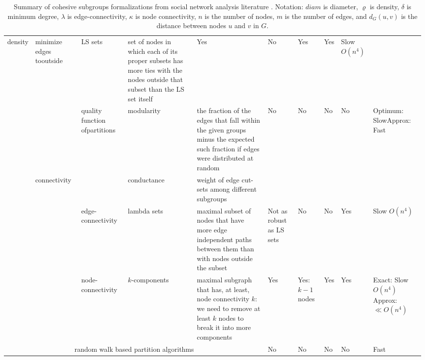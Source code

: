 \begin{table}
\begin{scriptsize}
\begin{tabular}{|c|p{1.5cm}|p{2.5cm}|p{1.9cm}|p{4.5cm}|p{1.4cm}|p{1.4cm}|p{1.4cm}|p{1.4cm}|p{2.5cm}|}
    \multirow{2}{*}{density}
        &minimize edges to\newline outside&LS sets&set of nodes in which each of its proper subsets
        has more ties with the nodes outside that subset than the LS set itself
        &Yes&No&Yes&Yes&Slow $O(n^4)$\\
        \cline{3-10}
        &&quality function of\newline partitions&modularity&the fraction of the edges that fall within
        the given groups minus the expected such fraction if edges were distributed at random
        &No&No&No&No&Optimum: Slow\newline Approx: Fast\\
        \cline{2-2} \cline{4-5}
    &\multirow{3}{*}{connectivity}
        &&conductance&weight of edge cut-sets among different subgroups&&&&& \\
        \cline{3-10}
        &&edge-connectivity&lambda sets&maximal subset of nodes that have more edge
        independent paths between them than with nodes outside the subset&Not as robust as LS sets&No&No&Yes
        &Slow $O(n^4)$\\
        \cline{3-10}
        &&node-connectivity&$k$-components&maximal subgraph that has, at least, node connectivity $k$:
        we need to remove at least $k$ nodes to break it into more components&Yes&Yes: $k-1$ nodes&Yes
        &Yes&Exact: Slow $O(n^4)$\newline Approx: $\ll O(n^4)$\\
\hline
\hline
\multicolumn{5}{|c|}{random walk based partition algorithms}&No&No&No&No&Fast\\
\hline
\end{tabular}
\end{scriptsize}
\caption[Summary of cohesive subgroups formalizations.]{Summary of cohesive subgroups formalizations from social network analysis literature \citep{luce:1949,luccio:1969,lawler:1973,seidman:1978,mokken:1979,seidman:1983,seidman:1983ls,borgatti:1990,wasserman:1994,white:2001,moody:2003,brandes:2005,fortunato:2010}. Notation: $diam$ is diameter, $\varrho$ is density, $\delta$ is minimum degree, $\lambda$ is edge-connectivity, $\kappa$ is node connectivity, $n$ is the number of nodes, $m$ is the number of edges, and $d_{G}(u,v)$ is the distance between nodes $u$ and $v$ in $G$.}
\label{t:cohesive}
\end{table}
